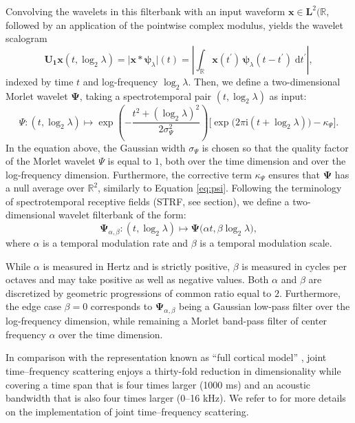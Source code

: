 \documentclass{bmcart}
\newcommand{\lnameref}[1]{%
\bgroup
\let\nmu\MakeLowercase
\nameref{#1}\egroup}
\newcommand{\nmu}{}
\begin{document}
Convolving the wavelets in this filterbank with an input waveform $\boldsymbol{x}\in\mathbf{L}^2(\mathbb{R}$, followed by an application of the pointwise complex modulus, yields the wavelet scalogram
\begin{equation}
\mathbf{U_1}\boldsymbol{x}(t,\log_2\lambda) =
\big\vert
\boldsymbol{x}
\ast
\boldsymbol{\psi}_{\lambda}
\big\vert(t)
=
\left\vert
\int_{\mathbb{R}}
\boldsymbol{x}(t^{\prime})
\,
\boldsymbol{\psi}_{\lambda} (t - t^{\prime})
\;
\mathrm{d}{t^\prime}
\right\vert,
\end{equation}
indexed by time $t$ and log-frequency $\log_2\lambda$.
Then, we define a two-dimensional Morlet wavelet $\boldsymbol{\Psi}$, taking a spectrotemporal pair $(t, \log_2 \lambda)$ as input:
\begin{equation}
\Psi : (t,\log_2 \lambda) \longmapsto 
\exp\left(-\dfrac{t^2+(\log_2 \lambda)^2}{2\sigma_{\Psi}^2}\right) 
\Big[ \exp\big(2\pi \mathrm{i} (t + \log_2 \lambda)\big) - \kappa_{\Psi} \Big].
\end{equation}
In the equation above, the Gaussian width $\sigma_{\Psi}$ is chosen so that the quality factor of the Morlet wavelet $\Psi$ is equal to $1$, both over the time dimension and over the log-frequency dimension.
Furthermore, the corrective term $\kappa_{\Psi}$ ensures that $\boldsymbol{\Psi}$ has a null average over $\mathbb{R}^2$, similarly to Equation \ref{eq:psi}.
Following the terminology of spectrotemporal receptive fields (STRF, see \lnameref{sec:soa} section), we define a two-dimensional wavelet filterbank of the form:
\begin{equation}
\mathbf{\Psi}_{\alpha,\beta} : (t, \log_2 \lambda) \longmapsto
\mathbf{\Psi}\big(\alpha t, \beta \log_2 \lambda \big),
\end{equation}
where $\alpha$ is a temporal modulation rate and $\beta$ is a temporal modulation scale.

While $\alpha$ is measured in Hertz and is strictly positive, $\beta$ is measured in cycles per octaves and may take positive as well as negative values.
Both $\alpha$ and $\beta$ are discretized by geometric progressions of common ratio equal to $2$.
Furthermore, the edge case $\beta=0$ corresponds to $\mathbf{\Psi}_{\alpha,\beta}$ being a Gaussian low-pass filter over the log-frequency dimension, while remaining a Morlet band-pass filter of center frequency $\alpha$ over the time dimension.


In comparison with the representation known as ``full cortical model'' \cite{patil2012ploscompbiol}, joint time--frequency scattering enjoys a thirty-fold reduction in dimensionality while covering a time span that is four times larger (1000 ms) and an acoustic bandwidth that is also four times larger (0--16 kHz).
We refer to \cite{anden2019tsp} for more details on the implementation of joint time--frequency scattering.
\end{document}
